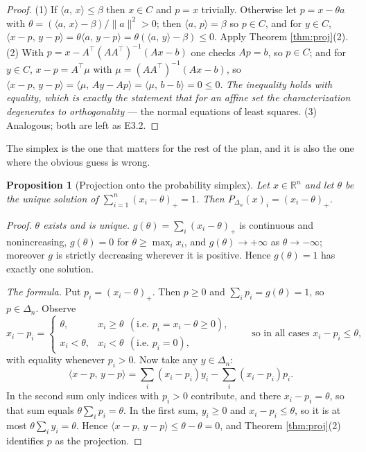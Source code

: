 \documentclass[11pt,a4paper]{article}
\theoremstyle{definition}
\theoremstyle{plain}
\newtheorem{proposition}[theorem]{Proposition}
\theoremstyle{remark}
\newcommand{\R}{\mathbb{R}}
\newcommand{\ip}[2]{\langle #1,\, #2\rangle}
\newcommand{\norm}[1]{\lVert #1\rVert}
\newcommand{\proj}{P}
\newcommand{\Simplex}{\Delta}
\begin{document}
\begin{proof}
(1) If $\ip{a}{x}\le\beta$ then $x\in C$ and $p=x$ trivially. Otherwise let
$p=x-\theta a$ with $\theta=(\ip{a}{x}-\beta)/\norm a^2>0$; then $\ip{a}{p}=\beta$ so $p\in C$,
and for $y\in C$, $\ip{x-p}{y-p}=\theta\ip{a}{y-p}=\theta(\ip{a}{y}-\beta)\le0$. Apply Theorem
\ref{thm:proj}(2).
(2) With $p=x-A^\top(AA^\top)^{-1}(Ax-b)$ one checks $Ap=b$, so $p\in C$; and for $y\in C$,
$x-p=A^\top\mu$ with $\mu=(AA^\top)^{-1}(Ax-b)$, so
$\ip{x-p}{y-p}=\ip{\mu}{Ay-Ap}=\ip{\mu}{b-b}=0\le0$. \emph{The inequality holds with equality,
which is exactly the statement that for an affine set the characterization degenerates to
orthogonality} --- the normal equations of least squares.
(3) Analogous; both are left as E3.2.
\end{proof}

The simplex is the one that matters for the rest of the plan, and it is also the one where the
obvious guess is wrong.

\begin{proposition}[Projection onto the probability simplex]
\label{prop:simplex}
Let $x\in\R^n$ and let $\theta$ be the unique solution of $\sum_{i=1}^n(x_i-\theta)_+=1$. Then
$\proj_{\Simplex_n}(x)_i=(x_i-\theta)_+$.
\end{proposition}

\begin{proof}
\emph{$\theta$ exists and is unique.} $g(\theta)=\sum_i(x_i-\theta)_+$ is continuous and
nonincreasing, $g(\theta)=0$ for $\theta\ge\max_ix_i$, and $g(\theta)\to+\infty$ as
$\theta\to-\infty$; moreover $g$ is strictly decreasing wherever it is positive. Hence
$g(\theta)=1$ has exactly one solution.

\emph{The formula.} Put $p_i=(x_i-\theta)_+$. Then $p\ge0$ and $\sum_ip_i=g(\theta)=1$, so
$p\in\Simplex_n$. Observe
\[
x_i-p_i=\begin{cases}\theta,& x_i\ge\theta\ \ (\text{i.e.\ }p_i=x_i-\theta\ge0),\\
x_i<\theta,& x_i<\theta\ \ (\text{i.e.\ }p_i=0),\end{cases}
\qquad\text{so in all cases } x_i-p_i\le\theta,
\]
with equality whenever $p_i>0$. Now take any $y\in\Simplex_n$:
\[
\ip{x-p}{y-p}=\sum_i(x_i-p_i)y_i-\sum_i(x_i-p_i)p_i .
\]
In the second sum only indices with $p_i>0$ contribute, and there $x_i-p_i=\theta$, so that sum
equals $\theta\sum_ip_i=\theta$. In the first sum, $y_i\ge0$ and $x_i-p_i\le\theta$, so it is at
most $\theta\sum_iy_i=\theta$. Hence $\ip{x-p}{y-p}\le\theta-\theta=0$, and Theorem
\ref{thm:proj}(2) identifies $p$ as the projection.
\end{proof}
\end{document}

